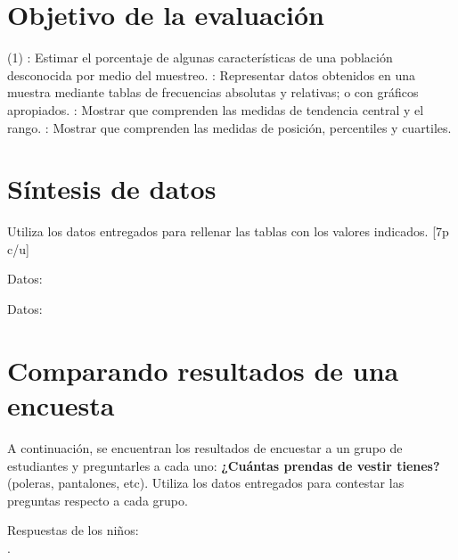 \documentclass[sin curso]{plantilla-evaluacion-v1}
\begin{document}
\section*{Objetivo de la evaluación}

\begin{tasks}[style=itemize](1)
  : Estimar el porcentaje de algunas características de una
  población desconocida por medio del muestreo.
  : Representar datos obtenidos en una muestra mediante
  tablas de frecuencias absolutas y relativas; o con gráficos apropiados.
  : Mostrar que comprenden las medidas de tendencia central
  y el rango.
  : Mostrar que comprenden las medidas de posición,
  percentiles y cuartiles.
\end{tasks}

\section{Síntesis de datos}

Utiliza los datos entregados para rellenar las tablas con los valores indicados. [7p c/u]

\begin{preguntas}[after-item-skip=15pt,resume=false]
  \pregunta Datos: 
  \begin{malla}[height=3cm]
  \end{malla}
  \usebox{\tablaQ}\hspace{15pt}\usebox{\tablaM}

  \pregunta Datos: 
  \begin{malla}[height=3cm]
  \end{malla}
  \usebox{\tablaQ}\hspace{15pt}\usebox{\tablaM}
\end{preguntas}

\section{Comparando resultados de una encuesta}

A continuación, se encuentran los resultados de encuestar a un grupo de estudiantes y
preguntarles a cada uno: \textbf{¿Cuántas prendas de vestir tienes?}
(poleras, pantalones, etc). Utiliza los datos entregados para contestar las preguntas
respecto a cada grupo. \par
Respuestas de los niños:\\[5pt]
\hspace*{20pt}.
\end{document}

